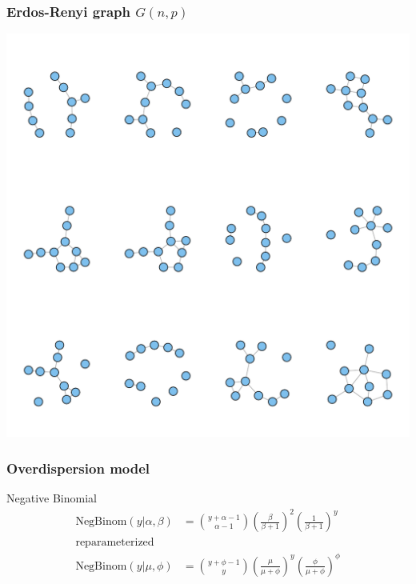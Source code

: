 \documentclass{beamer}
\begin{document}
%
%
%

\begin{frame}
  \frametitle{Erdos-Renyi graph \(G(n, p)\)}
  \begin{center}
    \includegraphics[height = 0.8\textheight, width = \textwidth,  keepaspectratio = true]{figure/rng_graphs}
  \end{center}
\end{frame}

\begin{frame}
  \frametitle{Overdispersion model}

  \begin{block}{Negative Binomial}
    \begin{align*}
      \mathrm{NegBinom}(y | \alpha, \beta) &= {y + \alpha -1 \choose \alpha - 1} \left(\frac{\beta}{\beta + 1}\right)^{2} \left(\frac{1}{\beta + 1}\right)^{y} \\
      \mathrm{reparameterized} \\
      \mathrm{NegBinom}(y | \mu, \phi) &= {y + \phi -1 \choose y} \left(\frac{\mu}{\mu + \phi}\right)^{y} \left(\frac{\phi}{\mu + \phi}\right)^{\phi}
    \end{align*}
  \end{block}
\end{frame}
\end{document}
